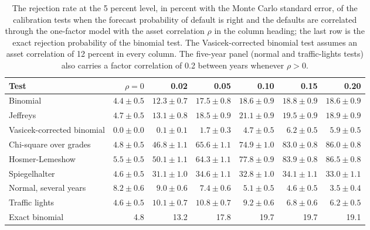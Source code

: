 \begin{table}[htbp]
\centering
\setlength{\tabcolsep}{3pt}
\footnotesize
\caption{The rejection rate at the 5 percent level, in percent with the Monte Carlo standard error, of the calibration tests when the forecast probability of default is right and the defaults are correlated through the one-factor model with the asset correlation $\rho$ in the column heading; the last row is the exact rejection probability of the binomial test. The Vasicek-corrected binomial test assumes an asset correlation of 12 percent in every column. The five-year panel (normal and traffic-lights tests) also carries a factor correlation of 0.2 between years whenever $\rho>0$.}
\label{tab:vt-cluster}
\begin{tabular}{lrrrrrr}
\toprule
Test & $\rho=0$ & 0.02 & 0.05 & 0.10 & 0.15 & 0.20 \\
\midrule
Binomial & $4.4\pm0.5$ & $12.3\pm0.7$ & $17.5\pm0.8$ & $18.6\pm0.9$ & $18.8\pm0.9$ & $18.6\pm0.9$ \\
Jeffreys & $4.7\pm0.5$ & $13.1\pm0.8$ & $18.5\pm0.9$ & $21.1\pm0.9$ & $19.5\pm0.9$ & $18.9\pm0.9$ \\
Vasicek-corrected binomial & $0.0\pm0.0$ & $0.1\pm0.1$ & $1.7\pm0.3$ & $4.7\pm0.5$ & $6.2\pm0.5$ & $5.9\pm0.5$ \\
Chi-square over grades & $4.8\pm0.5$ & $46.8\pm1.1$ & $65.6\pm1.1$ & $74.9\pm1.0$ & $83.0\pm0.8$ & $86.0\pm0.8$ \\
Hosmer-Lemeshow & $5.5\pm0.5$ & $50.1\pm1.1$ & $64.3\pm1.1$ & $77.8\pm0.9$ & $83.9\pm0.8$ & $86.5\pm0.8$ \\
Spiegelhalter & $4.6\pm0.5$ & $31.1\pm1.0$ & $34.6\pm1.1$ & $32.8\pm1.0$ & $34.1\pm1.1$ & $33.0\pm1.1$ \\
Normal, several years & $8.2\pm0.6$ & $9.0\pm0.6$ & $7.4\pm0.6$ & $5.1\pm0.5$ & $4.6\pm0.5$ & $3.5\pm0.4$ \\
Traffic lights & $4.6\pm0.5$ & $10.1\pm0.7$ & $10.8\pm0.7$ & $9.2\pm0.6$ & $6.8\pm0.6$ & $6.2\pm0.5$ \\
Exact binomial & 4.8 & 13.2 & 17.8 & 19.7 & 19.7 & 19.1 \\
\bottomrule
\end{tabular}
\end{table}
